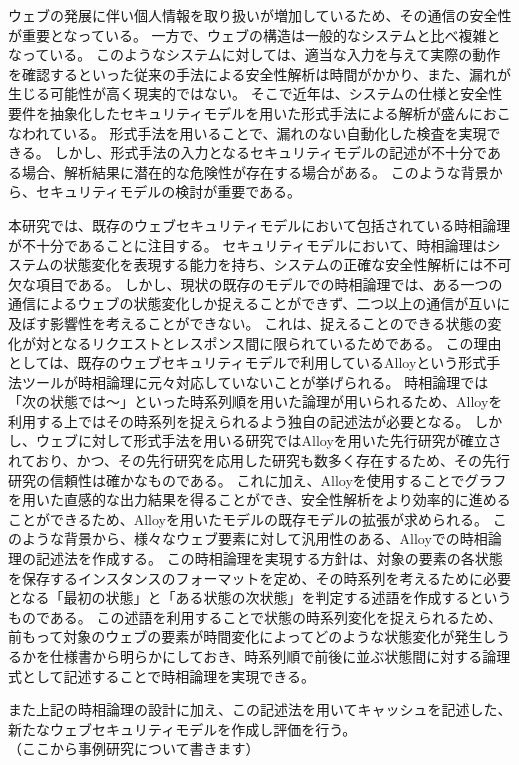 \documentclass[12pt,a4paper]{jbook}
\begin{document}
ウェブの発展に伴い個人情報を取り扱いが増加しているため、その通信の安全性が重要となっている。
一方で、ウェブの構造は一般的なシステムと比べ複雑となっている。
このようなシステムに対しては、適当な入力を与えて実際の動作を確認するといった従来の手法による安全性解析は時間がかかり、また、漏れが生じる可能性が高く現実的ではない。
そこで近年は、システムの仕様と安全性要件を抽象化したセキュリティモデルを用いた形式手法による解析が盛んにおこなわれている。
形式手法を用いることで、漏れのない自動化した検査を実現できる。
しかし、形式手法の入力となるセキュリティモデルの記述が不十分である場合、解析結果に潜在的な危険性が存在する場合がある。
このような背景から、セキュリティモデルの検討が重要である。

本研究では、既存のウェブセキュリティモデルにおいて包括されている時相論理が不十分であることに注目する。
セキュリティモデルにおいて、時相論理はシステムの状態変化を表現する能力を持ち、システムの正確な安全性解析には不可欠な項目である。
しかし、現状の既存のモデルでの時相論理では、ある一つの通信によるウェブの状態変化しか捉えることができず、二つ以上の通信が互いに及ぼす影響性を考えることができない。
これは、捉えることのできる状態の変化が対となるリクエストとレスポンス間に限られているためである。
この理由としては、既存のウェブセキュリティモデルで利用しているAlloyという形式手法ツールが時相論理に元々対応していないことが挙げられる。
時相論理では「次の状態では～」といった時系列順を用いた論理が用いられるため、Alloyを利用する上ではその時系列を捉えられるよう独自の記述法が必要となる。
しかし、ウェブに対して形式手法を用いる研究ではAlloyを用いた先行研究が確立されており、かつ、その先行研究を応用した研究も数多く存在するため、その先行研究の信頼性は確かなものである。
これに加え、Alloyを使用することでグラフを用いた直感的な出力結果を得ることができ、安全性解析をより効率的に進めることができるため、Alloyを用いたモデルの既存モデルの拡張が求められる。
このような背景から、様々なウェブ要素に対して汎用性のある、Alloyでの時相論理の記述法を作成する。
この時相論理を実現する方針は、対象の要素の各状態を保存するインスタンスのフォーマットを定め、その時系列を考えるために必要となる「最初の状態」と「ある状態の次状態」を判定する述語を作成するというものである。
この述語を利用することで状態の時系列変化を捉えられるため、前もって対象のウェブの要素が時間変化によってどのような状態変化が発生しうるかを仕様書から明らかにしておき、時系列順で前後に並ぶ状態間に対する論理式として記述することで時相論理を実現できる。

また上記の時相論理の設計に加え、この記述法を用いてキャッシュを記述した、新たなウェブセキュリティモデルを作成し評価を行う。
\\（ここから事例研究について書きます）
\end{document}
